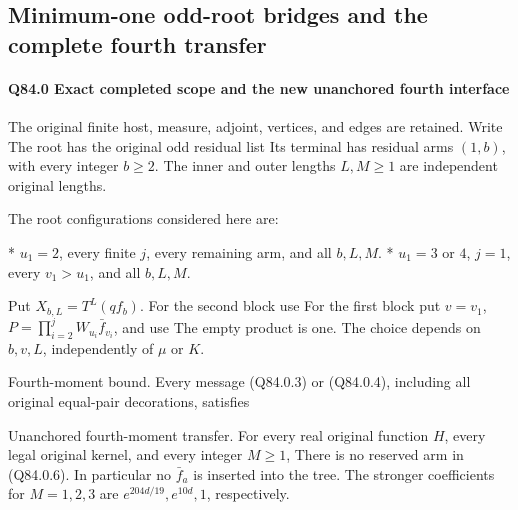 \subsection{Minimum-one odd-root bridges and the complete fourth transfer}\label{proof:Q5-C084}
\paragraph{Q84.0 Exact completed scope and the new unanchored fourth interface}

The original finite host, measure, adjoint, vertices, and edges are retained.
Write
The root has the original odd residual list
Its terminal has residual arms \((1,\allowbreak  b)\), with every integer \(b\ge2\).
The inner and outer lengths \(L,\allowbreak  M\ge1\) are independent original lengths.

The root configurations considered here are:

* \(u_1=2\), every finite \(j\), every remaining arm, and all \(b,\allowbreak  L,\allowbreak  M\).
* \(u_1=3\) or \(4\), \(j=1\), every \(v_1>u_1\), and all \(b,\allowbreak  L,\allowbreak  M\).

Put \(X_{b,\allowbreak  L}=T^L(qf_b)\). For the second block use
For the first block put \(v=v_1\),
\(P=\prod_{i=2}^j W_{u_i}\bar f_{v_i}\), and use
The empty product is one. The choice depends on \(b,\allowbreak  v,\allowbreak  L\), independently of \(\mu\) or \(K\).

Fourth-moment bound. Every message (Q84.0.3) or (Q84.0.4),
including all original equal-pair decorations, satisfies

Unanchored fourth-moment transfer. For every real original
function \(H\), every legal original kernel, and every integer \(M\ge1\),
There is no reserved arm in (Q84.0.6). In particular no \(\bar f_a\) is inserted
into the tree. The stronger coefficients for \(M=1,\allowbreak  2,\allowbreak  3\) are
\(e^{204d/19},\allowbreak  e^{10d},\allowbreak  1\), respectively.

